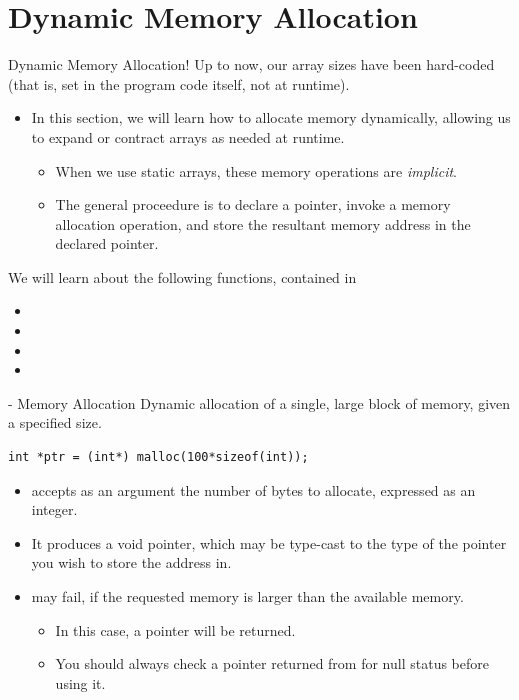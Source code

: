 \documentclass[11pt]{beamer}
\let\OldTexttt\texttt
\renewcommand{\texttt}[1]{\OldTexttt{\color{teal}{#1}}}
\begin{document}
\section[malloc]{Dynamic Memory Allocation}
\begin{frame}{Dynamic Memory Allocation!}
Up to now, our array sizes have been hard-coded (that is, set in the program code itself, not at runtime).
\begin{itemize}
\item In this section, we will learn how to allocate memory dynamically, allowing us to expand or contract arrays as needed at runtime. 
\begin{itemize}
\item When we use static arrays, these memory operations are \emph{implicit}.
\item The general proceedure is to declare a pointer, invoke a memory allocation operation, and store the resultant memory address in the declared pointer.
\end{itemize}
\end{itemize}
We will learn about the following functions, contained in \texttt{stdlib.h}
\vspace{-1em}
\begin{itemize}
\item \texttt{malloc()}
\item \texttt{free()}
\item \texttt{calloc()}
\item \texttt{realloc()}
\end{itemize}

\end{frame}

\begin{frame}[fragile=singleslide]{\texttt{malloc()} - Memory Allocation}
Dynamic allocation of a single, large block of memory, given a specified size.
\begin{lstlisting}[style=C]
int *ptr = (int*) malloc(100*sizeof(int));
\end{lstlisting}
\begin{itemize}
\item \texttt{malloc()} accepts as an argument the number of bytes to allocate, expressed as an integer.
\item It produces a void pointer, which may be type-cast to the type of the pointer you wish to store the address in.  
\item \texttt{malloc()} may fail, if the requested memory is larger than the available memory.
\begin{itemize}
\item In this case, a \texttt{NULL} pointer will be returned.
\item You should always check a pointer returned from \texttt{malloc()} for null status before using it.
\end{itemize}
\end{itemize}
\end{frame}
\end{document}
